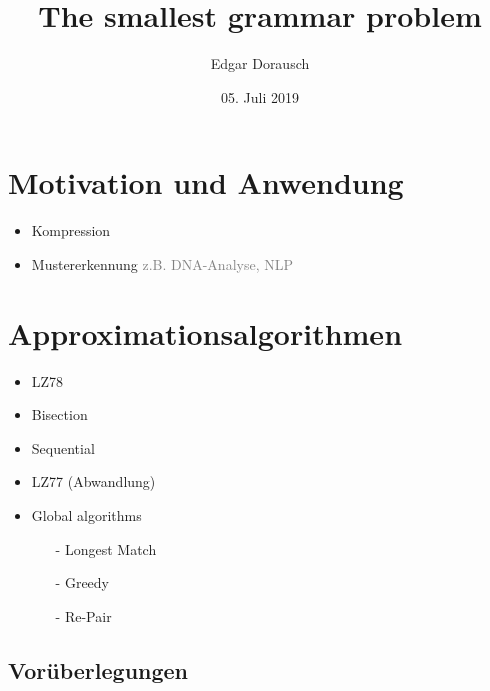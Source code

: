 \documentclass[xcolor=dvipsnames]{beamer}
\title{The smallest grammar problem}
\date{05. Juli 2019}
\author{Edgar Dorausch}
\begin{document}
\maketitle


\newcommand{\SubItem}[1]{
  \setlength\itemindent{15pt} \item[-] #1
}
\newcommand{\Gap}{$ $ \linebreak}
\newcommand{\FrameName}{
	\ifthenelse{\equal{\subsecname}{}}{
		\secname
	}{
		\secname \thinspace -\thinspace\subsecname
	}
}

\newcommand{\Fresh}{\ddagger}
\newcommand{\Hint}[1]{\textcolor{gray}{#1}}

\newcommand{\PDFC}[1]{
	\ifthenelse{\boolean{WithComments}}{
		\pdfcomment[color=red,icon=Note]{#1}
	}{
	}
}




\section{Motivation und Anwendung}

\begin{frame}{\FrameName}
	\begin{itemize}[<+->]
		\item Kompression
		\item Mustererkennung \linebreak
		\Hint{z.B. DNA-Analyse, NLP}
	\end{itemize}
\end{frame}







\section{Approximationsalgorithmen}

\begin{frame}{\FrameName}
	\begin{itemize}[<+->]
		\item LZ78
		\item Bisection 
		\item Sequential
		\item LZ77 (Abwandlung)
		\item Global algorithms
		\begin{itemize}
			\item[-] Longest Match
			\item[-] Greedy
			\item[-] Re-Pair
		\end{itemize}
	\end{itemize}
\end{frame}

\subsection{Vorüberlegungen}

\newcommand{\LowerBound}{\textcolor{TealBlue}{f_l(n)}}
\newcommand{\UpperBound}{\textcolor{Salmon}{f_u(n)}}








\end{document}
